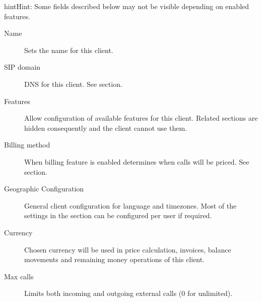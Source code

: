 \documentclass[letterpaper,10pt,english]{sphinxmanual}
\begin{document}
\begin{notice}{hint}{Hint:}
Some fields described below may not be visible depending on enabled features.
\end{notice}
\begin{description}
\item[{Name}] \leavevmode{}\label{administration_portal/brand/clients/virtual_pbx:term-name}
Sets the name for this client.

\item[{SIP domain}] \leavevmode{}\label{administration_portal/brand/clients/virtual_pbx:term-sip-domain}
DNS for this client. See {\hyperref[getting_started/internal_calls/brand_portal:client\string-sip\string-domain]{}} section.

\item[{Features}] \leavevmode{}\label{administration_portal/brand/clients/virtual_pbx:term-features}
Allow configuration of available features for this client.
Related sections are hidden consequently and the client cannot use them.

\item[{Billing method}] \leavevmode{}\label{administration_portal/brand/clients/virtual_pbx:term-billing-method}
When billing feature is enabled determines when calls will be priced. See {\hyperref[administration_portal/brand/billing/index:billing]{}} section.

\item[{Geographic Configuration}] \leavevmode{}\label{administration_portal/brand/clients/virtual_pbx:term-geographic-configuration}
General client configuration for language and timezones. Most of the settings in the section can be
configured per user if required.

\item[{Currency}] \leavevmode{}\label{administration_portal/brand/clients/virtual_pbx:term-currency}
Chosen currency will be used in price calculation, invoices, balance movements and
remaining money operations of this client.

\item[{Max calls}] \leavevmode{}\label{administration_portal/brand/clients/virtual_pbx:term-max-calls}
Limits both incoming and outgoing external calls (0 for unlimited).


\end{description}
\end{document}
